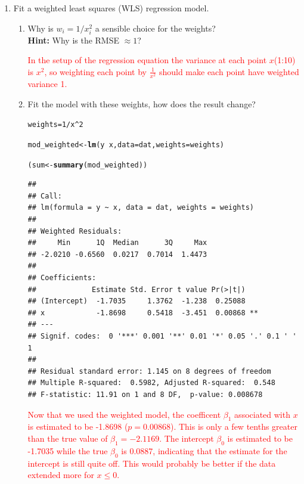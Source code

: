 \documentclass{article}\usepackage[]{graphicx}\usepackage[]{xcolor}
\makeatletter
\newcommand{\hlnum}[1]{\textcolor[rgb]{0.686,0.059,0.569}{#1}}%
\newcommand{\hlopt}[1]{\textcolor[rgb]{0,0,0}{#1}}%
\newcommand{\hldef}[1]{\textcolor[rgb]{0.345,0.345,0.345}{#1}}%
\newcommand{\hlkwb}[1]{\textcolor[rgb]{0.69,0.353,0.396}{#1}}%
\newcommand{\hlkwc}[1]{\textcolor[rgb]{0.333,0.667,0.333}{#1}}%
\newcommand{\hlkwd}[1]{\textcolor[rgb]{0.737,0.353,0.396}{\textbf{#1}}}%
\newenvironment{kframe}{%
 \def\at@end@of@kframe{}%
 \ifinner\ifhmode%
  \def\at@end@of@kframe{\end{minipage}}%
  \begin{minipage}{\columnwidth}%
 \fi\fi%
 \def\FrameCommand##1{\hskip\@totalleftmargin \hskip-\fboxsep
 \colorbox{shadecolor}{##1}\hskip-\fboxsep
     \hskip-\linewidth \hskip-\@totalleftmargin \hskip\columnwidth}%
 \MakeFramed {\advance\hsize-\width
   \@totalleftmargin\z@ \linewidth\hsize
   \@setminipage}}%
 {\par\unskip\endMakeFramed%
 \at@end@of@kframe}
\newenvironment{knitrout}{}{} %
\makeatother
\begin{document}
\begin{enumerate}
\begin{enumerate}
  \item Fit a weighted least squares (WLS) regression model.
  \begin{enumerate}
    \item Why is $w_i = 1/x_i^2$ a sensible choice for the weights?\\
    \textbf{Hint:} Why is the RMSE $\approx 1$?

\textcolor{red}{In the setup of the regression equation the variance at each point $x$(1:10) is $x^2$, so weighting each point by $\frac{1}{x^2}$ should make each point have weighted variance 1.}

    
    \item Fit the model with these weights, how does the result change?
    
\begin{knitrout}\scriptsize
{}\color{fgcolor}\begin{kframe}
\begin{alltt}
\hldef{weights} \hlkwb{=} \hlnum{1}\hlopt{/}\hldef{x}\hlopt{^}\hlnum{2}

\hldef{mod_weighted} \hlkwb{<-} \hlkwd{lm}\hldef{(y} \hlopt{~} \hldef{x,} \hlkwc{data} \hldef{= dat,} \hlkwc{weights} \hldef{= weights)}

\hldef{(sum} \hlkwb{<-} \hlkwd{summary}\hldef{(mod_weighted))}
\end{alltt}
\begin{verbatim}
## 
## Call:
## lm(formula = y ~ x, data = dat, weights = weights)
## 
## Weighted Residuals:
##     Min      1Q  Median      3Q     Max 
## -2.0210 -0.6560  0.0217  0.7014  1.4473 
## 
## Coefficients:
##             Estimate Std. Error t value Pr(>|t|)   
## (Intercept)  -1.7035     1.3762  -1.238  0.25088   
## x            -1.8698     0.5418  -3.451  0.00868 **
## ---
## Signif. codes:  0 '***' 0.001 '**' 0.01 '*' 0.05 '.' 0.1 ' ' 1
## 
## Residual standard error: 1.145 on 8 degrees of freedom
## Multiple R-squared:  0.5982,	Adjusted R-squared:  0.548 
## F-statistic: 11.91 on 1 and 8 DF,  p-value: 0.008678
\end{verbatim}
\end{kframe}
\end{knitrout}
 
 \textcolor{red}{Now that we used the weighted model, the coefficent $\beta_1$ associated with $x$ is estimated to be -1.8698 ($p = 0.00868$). This is only a few tenths greater than the true value of $\beta_1 = -2.1169$. The intercept $\beta_0$ is estimated to be -1.7035 while the true $\beta_0$ is 0.0887, indicating that the estimate for the intercept is still quite off. This would probably be better if the data extended more for $x \leq 0$.}
    

\end{enumerate}
\end{enumerate}
\end{enumerate}
\end{document}
